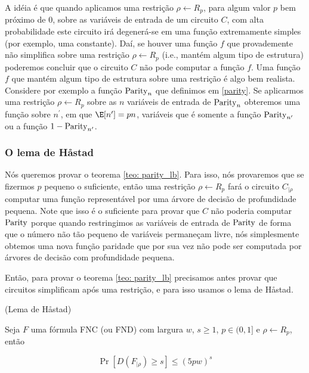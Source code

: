 A idéia é que quando aplicamos uma restrição $\rho \leftarrow R_{p}$, para algum valor $p$ bem próximo de 0, sobre as variáveis de entrada de um circuito $C$, com alta probabilidade este circuito irá degenerá-se em uma função extremamente simples (por exemplo, uma constante). Daí, se houver uma função $f$ que provademente não simplifica sobre uma restrição $\rho \leftarrow R_{p}$ (i.e., mantém algum tipo de estrutura) poderemos concluir que o circuito $C$ não pode computar a função $f$. Uma função $f$ que mantém algum tipo de estrutura sobre uma restrição é algo bem realista. Considere por exemplo a função $\text{Parity}_{n}$ que definimos em \ref{parity}. Se aplicarmos uma restrição $\rho \leftarrow R_{p}$ sobre as $n$ variáveis de entrada de $\text{Parity}_{n}$ obteremos uma função sobre $n^{\prime}$, em que $\E[n^{\prime}] = pn$, variáveis que é somente a função $\text{Parity}_{n^{\prime}}$ ou a função $1 - \text{Parity}_{n^{\prime}}$.

\subsubsection{O lema de Håstad}

Nós queremos provar o teorema \ref{teo: parity_lb}. Para isso, nós provaremos que se fizermos $p$ pequeno o suficiente, então uma restrição $\rho \leftarrow R_{p}$ fará o circuito $C_{\lvert \rho}$ computar uma função representável por uma árvore de decisão de profundidade pequena. Note que isso é o suficiente para provar que $C$ não poderia computar $\text{Parity}$ porque quando restringimos as variáveis de entrada de $\text{Parity}$ de forma que o número não tão pequeno de variáveis permaneçam livre, nós simplesmente obtemos uma nova função paridade que por sua vez não pode ser computada por árvores de decisão com profundidade pequena.

Então, para provar o teorema \ref{teo: parity_lb} precisamos antes provar que circuitos simplificam após uma restrição, e para isso usamos o lema de Håstad.

\begin{lema} (Lema de Håstad) \label{hastad_lemma}

Seja $F$ uma fórmula FNC (ou FND) com largura $w$, $s \geq 1$, $p \in (0, 1]$ e $\rho \leftarrow R_{p}$, então

\begin{equation*}
	\Pr[D(F_{\lvert \rho}) \geq s] \leq (5pw)^{s}
\end{equation*}

\end{lema}

